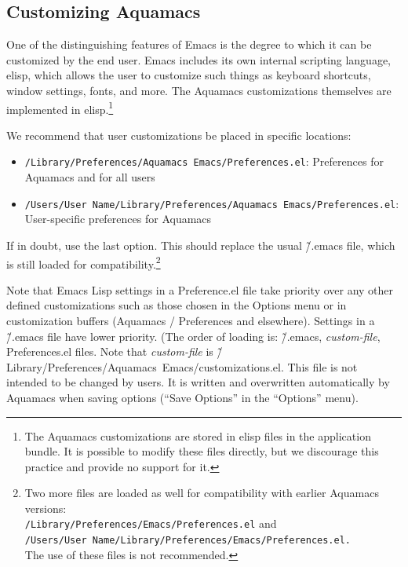 \documentclass[11pt,letterpaper]{article}
\newcommand{\ttfile}{\tt}
\begin{document}
\subsection{Customizing Aquamacs}
One of the distinguishing features of Emacs is the degree to which it can be customized by the end user. Emacs includes its own internal scripting language, elisp, which allows the user to customize such things as keyboard shortcuts, window settings, fonts, and more. The Aquamacs customizations themselves are implemented in elisp.\footnote{The Aquamacs customizations are stored in elisp files in the application bundle. It is possible to modify these files directly, but we discourage this practice and provide no support for it.}


We recommend that user customizations be placed in specific locations:

\begin{itemize}
\item {\ttfile /Library/Preferences/Aquamacs~Emacs/Preferences.el}: Preferences for  Aquamacs and for all users
\item {\ttfile /Users/User Name/Library/Preferences/Aquamacs~Emacs/Preferences.el}: \\ User-specific  preferences for Aquamacs
\end{itemize}

If in doubt, use the last option. This should replace the usual \~/.emacs file, which is still loaded for
compatibility.\footnote{Two more files are loaded as well for
  compatibility with earlier Aquamacs versions: \\
  {\ttfile /Library/Preferences/Emacs/Preferences.el} and \\
  {\ttfile /Users/User Name/Library/Preferences/Emacs/Preferences.el.}
  \\ The use of
  these files is not recommended.}

Note that Emacs Lisp settings in a Preference.el file take priority over any other defined customizations such as those chosen in the Options menu or in customization buffers (Aquamacs / Preferences and elsewhere).  Settings in a \~/.emacs file have lower priority.  (The order of loading is: \~/.emacs, \emph{custom-file}, Preferences.el files.  Note that \emph{custom-file} is \~/Library/Preferences/Aquamacs~Emacs/customizations.el.  This file is not intended to be changed by users.  It is written and overwritten automatically by Aquamacs when saving options (``Save Options'' in the ``Options'' menu).
\end{document}
